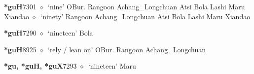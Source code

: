   \begin{list}{}{\leftmargin=1.5em \itemindent=-1.5em}
  \item {\footnotesize \textbf{*guH}}{\tiny 7301}
         $\diamond$~`nine'
         OBur. 
\hspace{1ex}
         Rangoon 
\hspace{1ex}
         Achang\_Longchuan 
\hspace{1ex}
         Atsi 
\hspace{1ex}
         Bola 
\hspace{1ex}
         Lashi 
\hspace{1ex}
         Maru 
\hspace{1ex}
         Xiandao 
\hspace{1ex}
         $\diamond$~`ninety'
         Rangoon 
\hspace{1ex}
         Achang\_Longchuan 
\hspace{1ex}
         Atsi 
\hspace{1ex}
         Bola 
\hspace{1ex}
         Lashi 
\hspace{1ex}
         Maru 
\hspace{1ex}
         Xiandao 
  \item {\footnotesize \textbf{*guH}}{\tiny 7290}
\hspace{1ex}
         $\diamond$~`nineteen'
         Bola 
  \item {\footnotesize \textbf{*guH}}{\tiny 8925}
\hspace{1ex}
         $\diamond$~`rely / lean on'
         OBur. 
\hspace{1ex}
         Rangoon 
\hspace{1ex}
         Achang\_Longchuan 
  \item {\footnotesize \textbf{*gu, *guH, *guX}}{\tiny 7293}
\hspace{1ex}
         $\diamond$~`nineteen'
         Maru 
  \end{list}
